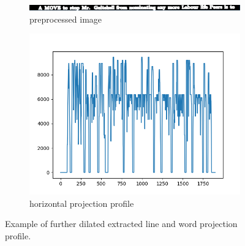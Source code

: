 \documentclass[english, paper=a4]{scrartcl}
\begin{document}
\begin{figure}[b!]
	\centering
	\begin{subfigure}[t!]{0.40\textwidth}
		\includegraphics[width=\textwidth]{PreprocessedLine.png}
		\caption{preprocessed image}
		\label{fig:ex2a}
	\end{subfigure}
	\begin{subfigure}[t!]{0.40\textwidth}
		\includegraphics[width=\textwidth]{VertProjectionWord.png}
		\caption{horizontal projection profile}
		\label{fig:ex2b}
	\end{subfigure}
	\caption{Example of further dilated extracted line and word projection profile.}
	\label{fig:ex_proj_vert}
\end{figure}
\end{document}

